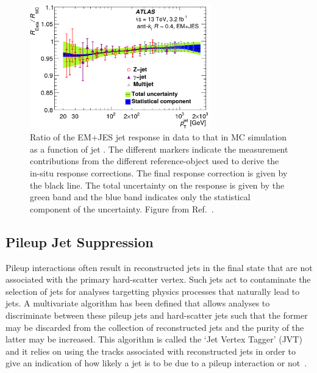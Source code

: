 \begin{figure}[!htb]
    \begin{center}
        \includegraphics[width=0.7\textwidth]{figures/chapter3/jets/jet_corr_insitu}
        \caption{
            Ratio of the EM+JES jet response in data to that in MC simulation as a function of jet \pT.
            The different markers indicate the measurement contributions from the different
            reference-object used to derive the in-situ response corrections.
            The final response correction is given by the black line.
            The total uncertainty on the response is given by the green band and the blue band
            indicates only the statistical component of the uncertainty.
            Figure from Ref.~\cite{Aaboud:2017jcu}.
        }
        \label{fig:jet_corr_insitu}
    \end{center}
\end{figure}
\FloatBarrier

%
%
\subsection{Pileup Jet Suppression}
\label{sec:jvt}

Pileup interactions often result in reconstructed jets in the final state that are not associated with the
primary hard-scatter vertex.
Such jets act to contaminate the selection of jets for analyses targetting physics processes that
naturally lead to jets.
A multivariate algorithm has been defined that allows analyses to discriminate between these pileup jets
and hard-scatter jets such that the former may be discarded from the collection of reconstructed
jets and the purity of the latter may be increased.
This algorithm is called the `Jet Vertex Tagger' (JVT) and it relies on using the tracks
associated with reconstructed jets in order to give an indication of how likely a jet
is to be due to a pileup interaction or not~\cite{JVT}.

